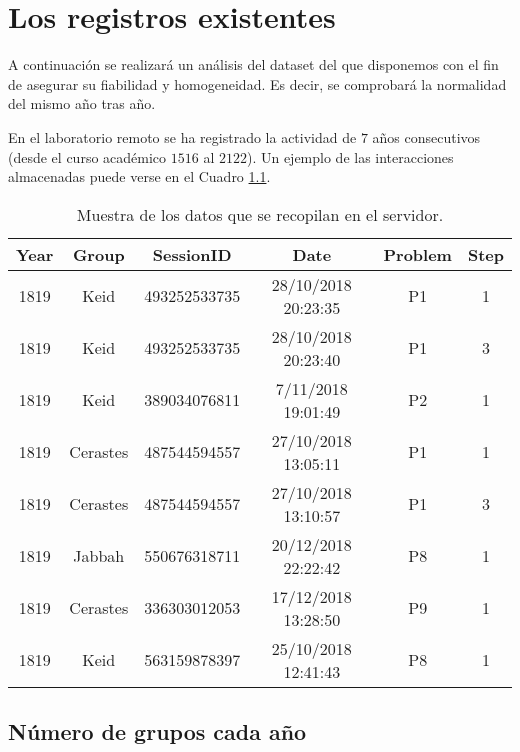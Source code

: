 \chapter{Los registros existentes}\label{sec:chapterVI}

A continuación se realizará un análisis del dataset del que disponemos con el fin de asegurar su fiabilidad y homogeneidad. Es decir, se comprobará la normalidad del mismo año tras año.

En el laboratorio remoto se ha registrado la actividad de $7$ años consecutivos (desde el curso académico $1516$ al $2122$). Un ejemplo de las interacciones almacenadas puede verse en el Cuadro \ref{tab:example}.

\begin{table}[H]
\centering
\caption{Muestra de los datos que se recopilan en el servidor.}
\label{tab:example}
\begin{tabular}{cccccc}
\hline
\textbf{Year} & \textbf{Group} & \textbf{SessionID} & \textbf{Date}       & \textbf{Problem} & \textbf{Step} \\ \hline
1819          & Keid           & 493252533735       & 28/10/2018 20:23:35 & P1               & 1             \\ 
1819          & Keid           & 493252533735       & 28/10/2018 20:23:40 & P1               & 3             \\ 
1819          & Keid           & 389034076811       & 7/11/2018 19:01:49  & P2               & 1             \\
1819          & Cerastes       & 487544594557       & 27/10/2018 13:05:11 & P1               & 1             \\
1819          & Cerastes       & 487544594557       & 27/10/2018 13:10:57 & P1               & 3             \\
1819          & Jabbah         & 550676318711       & 20/12/2018 22:22:42 & P8               & 1             \\
1819          & Cerastes       & 336303012053       & 17/12/2018 13:28:50 & P9               & 1             \\ 
1819          & Keid           & 563159878397       & 25/10/2018 12:41:43 & P8               & 1             \\ \hline
\end{tabular}
\end{table}

\section{Número de grupos cada año}

